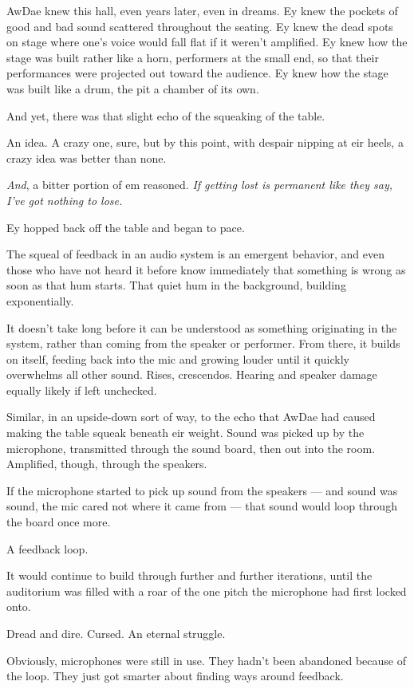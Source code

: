 AwDae knew this hall, even years later, even in dreams. Ey knew the pockets of good and bad sound scattered throughout the seating. Ey knew the dead spots on stage where one's voice would fall flat if it weren't amplified. Ey knew how the stage was built rather like a horn, performers at the small end, so that their performances were projected out toward the audience. Ey knew how the stage was built like a drum, the pit a chamber of its own.

And yet, there was that slight echo of the squeaking of the table.

An idea. A crazy one, sure, but by this point, with despair nipping at eir heels, a crazy idea was better than none.

\emph{And}, a bitter portion of em reasoned. \emph{If getting lost is permanent like they say, I've got nothing to lose.}

Ey hopped back off the table and began to pace.

The squeal of feedback in an audio system is an emergent behavior, and even those who have not heard it before know immediately that something is wrong as soon as that hum starts. That quiet hum in the background, building exponentially.

It doesn't take long before it can be understood as something originating in the system, rather than coming from the speaker or performer. From there, it builds on itself, feeding back into the mic and growing louder until it quickly overwhelms all other sound. Rises, crescendos. Hearing and speaker damage equally likely if left unchecked.

Similar, in an upside-down sort of way, to the echo that AwDae had caused making the table squeak beneath eir weight. Sound was picked up by the microphone, transmitted through the sound board, then out into the room. Amplified, though, through the speakers.

If the microphone started to pick up sound from the speakers — and sound was sound, the mic cared not where it came from — that sound would loop through the board once more.

A feedback loop.

It would continue to build through further and further iterations, until the auditorium was filled with a roar of the one pitch the microphone had first locked onto.

Dread and dire. Cursed. An eternal struggle.

Obviously, microphones were still in use. They hadn't been abandoned because of the loop. They just got smarter about finding ways around feedback.

